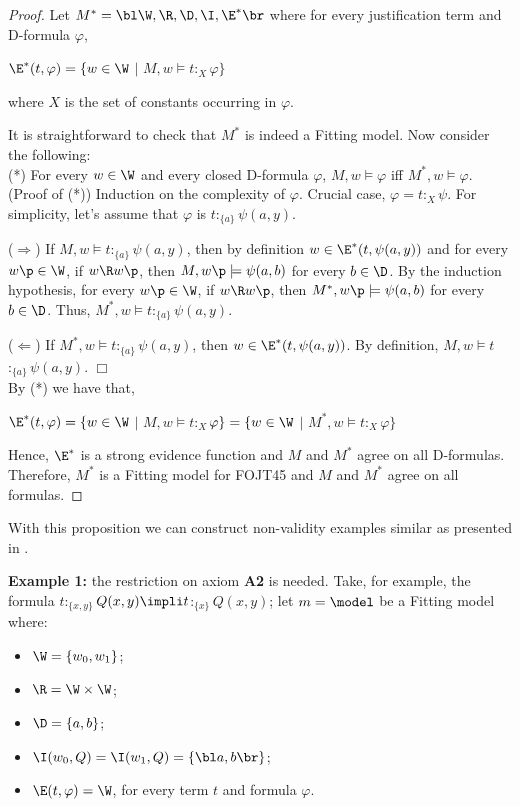 \begin{proof}
\qquad Let $M^{*} =\bl\W,\R,\D,\I,\E^{*} \br$ where for every justification term and D-formula $\varphi$,

\begin{center}
$\E^{*}(t,\varphi) = \{w \in \W$ $|$ $ M,w \models t$$:_{X}$$\varphi\}$
\end{center}

where $X$ is the set of constants occurring in $\varphi$. 

\qquad It is straightforward to check that $M^{*}$ is indeed a Fitting model. Now consider the following:\\
 
 (*) For every $w \in \W$ and every closed D-formula $\varphi$, $M,w \models \varphi$ iff $M^{*},w \models \varphi$.\\
 
 (Proof of (*)) Induction on the complexity of $\varphi$. Crucial case, $\varphi = t$$:_{X}$$\psi$. For simplicity, let's assume that $\varphi$ is $t$$:_{\{a\}}$$\psi(a,y)$.

\qquad ($\Rightarrow$) If $M,w \models t$$:_{\{a\}}$$\psi(a,y)$, then by definition $w \in \E^{*}(t, \psi(a,y))$ and for every $w\p \in \W$, if $w\R w\p$, then $M,w\p \models \psi(a,b)$ for every $b \in \D$. By the induction hypothesis, for every $w\p \in \W$, if $w\R w\p$, then $M^{*},w\p \models \psi(a,b)$ for every $b \in \D$. Thus, $M^{*},w \models t$$:_{\{a\}}$$\psi(a,y)$.

\qquad ($\Leftarrow$) If $M^{*},w \models t$$:_{\{a\}}$$\psi(a,y)$, then $w \in \E^{*}(t, \psi(a,y))$. By definition, $M,w \models t$$:_{\{a\}}$$\psi(a,y)$. $\Box$\\


\qquad By (*) we have that,

\begin{center}
	$\E^{*}(t,\varphi) = \{w \in \W$ $|$ $ M,w \models t$$:_{X}$$\varphi\} = \{w \in \W$ $|$ $ M^{*},w \models t$$:_{X}$$\varphi\}$
\end{center}


\qquad Hence, $\E^{*}$ is a strong evidence function and $M$ and $M^{*}$ agree on all D-formulas. Therefore, $M^{*}$ is a Fitting model for FOJT45 and $M$ and $M^{*}$ agree on all formulas.
\end{proof}


\qquad With this proposition we can construct non-validity examples similar as presented in \cite{Fitting14}.

\qquad \textbf{Example 1:} the restriction on axiom \textbf{A2} is needed. Take, for example, the formula $t$$:_{\{x,y\}}$$Q(x,y) \impli t$$:_{\{x\}}$$Q(x,y)$; let $m =\model$ be a Fitting model where:
\begin{itemize}
\item $\W = \{w_0, w_1\}$;
\item $\R = \W \times \W$;
\item $\D = \{a, b\}$;
\item $\I(w_{0},Q) = \I(w_{1},Q) = \{\bl a,b \br\}$;
\item $\E(t,\varphi) = \W$, for every term $t$ and formula $\varphi$.
\end{itemize}


